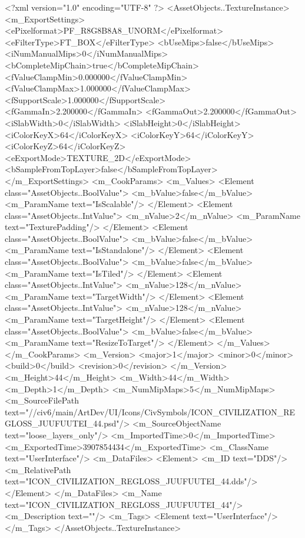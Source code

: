 <?xml version="1.0" encoding="UTF-8" ?>
<AssetObjects..TextureInstance>
	<m_ExportSettings>
		<ePixelformat>PF_R8G8B8A8_UNORM</ePixelformat>
		<eFilterType>FT_BOX</eFilterType>
		<bUseMips>false</bUseMips>
		<iNumManualMips>0</iNumManualMips>
		<bCompleteMipChain>true</bCompleteMipChain>
		<fValueClampMin>0.000000</fValueClampMin>
		<fValueClampMax>1.000000</fValueClampMax>
		<fSupportScale>1.000000</fSupportScale>
		<fGammaIn>2.200000</fGammaIn>
		<fGammaOut>2.200000</fGammaOut>
		<iSlabWidth>0</iSlabWidth>
		<iSlabHeight>0</iSlabHeight>
		<iColorKeyX>64</iColorKeyX>
		<iColorKeyY>64</iColorKeyY>
		<iColorKeyZ>64</iColorKeyZ>
		<eExportMode>TEXTURE_2D</eExportMode>
		<bSampleFromTopLayer>false</bSampleFromTopLayer>
	</m_ExportSettings>
	<m_CookParams>
		<m_Values>
			<Element class="AssetObjects..BoolValue">
				<m_bValue>false</m_bValue>
				<m_ParamName text="IsScalable"/>
			</Element>
			<Element class="AssetObjects..IntValue">
				<m_nValue>2</m_nValue>
				<m_ParamName text="TexturePadding"/>
			</Element>
			<Element class="AssetObjects..BoolValue">
				<m_bValue>false</m_bValue>
				<m_ParamName text="IsStandalone"/>
			</Element>
			<Element class="AssetObjects..BoolValue">
				<m_bValue>false</m_bValue>
				<m_ParamName text="IsTiled"/>
			</Element>
			<Element class="AssetObjects..IntValue">
				<m_nValue>128</m_nValue>
				<m_ParamName text="TargetWidth"/>
			</Element>
			<Element class="AssetObjects..IntValue">
				<m_nValue>128</m_nValue>
				<m_ParamName text="TargetHeight"/>
			</Element>
			<Element class="AssetObjects..BoolValue">
				<m_bValue>false</m_bValue>
				<m_ParamName text="ResizeToTarget"/>
			</Element>
		</m_Values>
	</m_CookParams>
	<m_Version>
		<major>1</major>
		<minor>0</minor>
		<build>0</build>
		<revision>0</revision>
	</m_Version>
	<m_Height>44</m_Height>
	<m_Width>44</m_Width>
	<m_Depth>1</m_Depth>
	<m_NumMipMaps>5</m_NumMipMaps>
	<m_SourceFilePath text="//civ6/main/ArtDev/UI/Icons/CivSymbols/ICON_CIVILIZATION_REGLOSS_JUUFUUTEI_44.psd"/>
	<m_SourceObjectName text="loose_layers_only"/>
	<m_ImportedTime>0</m_ImportedTime>
	<m_ExportedTime>3907854434</m_ExportedTime>
	<m_ClassName text="UserInterface"/>
	<m_DataFiles>
		<Element>
			<m_ID text="DDS"/>
			<m_RelativePath text="ICON_CIVILIZATION_REGLOSS_JUUFUUTEI_44.dds"/>
		</Element>
	</m_DataFiles>
	<m_Name text="ICON_CIVILIZATION_REGLOSS_JUUFUUTEI_44"/>
	<m_Description text=""/>
	<m_Tags>
		<Element text="UserInterface"/>
	</m_Tags>
</AssetObjects..TextureInstance>

